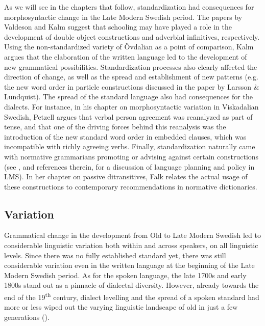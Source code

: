 \documentclass[output=paper]{langscibook}
\begin{document}
As we will see in the chapters that follow, standardization had consequences for morphosyntactic change in the Late Modern Swedish period. The papers by Valdeson and Kalm suggest that schooling may have played a role in the development of double object constructions and adverbial infinitives, respectively. Using the non-standardized variety of Övdalian as a point of comparison, Kalm argues that the elaboration of the written language led to the development of new grammatical possibilities. Standardization processes also clearly affected the direction of change, as well as the spread and establishment of new patterns (e.g. the new word order in particle constructions discussed in the paper by Larsson \& Lundquist). The spread of the standard language also had consequences for the dialects. For instance, in his chapter on morphosyntactic variation in Viskadalian Swedish, Petzell argues that verbal person agreement was reanalyzed as part of tense, and that one of the driving forces behind this reanalysis was the introduction of the new standard word order in embedded clauses, which was incompatible with richly agreeing verbs. Finally, standardization naturally came with normative grammarians promoting or advising against certain constructions (see \citealt{Teleman2002, Teleman2003Tradis}, and references therein, for a discussion of language planning and policy in LMS). In her chapter on passive ditransitives, Falk relates the actual usage of these constructions to contemporary recommendations in normative dictionaries. 


\subsection{Variation}\label{sec:intro:2.2}


Grammatical change in the development from Old to Late Modern Swedish led to considerable linguistic variation both within and across speakers, on all linguistic levels. Since there was no fully established standard yet, there was still considerable variation even in the written language at the beginning of the Late Modern Swedish period. As for the spoken language, the late 1700s and early 1800s stand out as a pinnacle of dialectal diversity. However, already towards the end of the 19\textsuperscript{th} century, dialect levelling and the spread of a spoken standard had more or less wiped out the varying linguistic landscape of old in just a few generations (\citealt{NilssonPetzell2015}).
\end{document}
